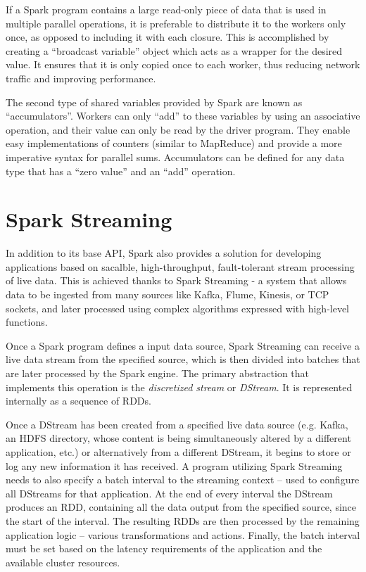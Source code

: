 \documentclass{l4proj}
\begin{document}
If a Spark program contains a large read-only piece of data that is used in multiple parallel operations, it is preferable to distribute it to the workers only once, as opposed to including it with each closure. This is accomplished by creating a ``broadcast variable'' object which acts as a wrapper for the desired value. It ensures that it is only copied once to each worker, thus reducing network traffic and improving performance.

The second type of shared variables provided by Spark are known as ``accumulators''. Workers can only ``add'' to these variables by using an associative operation, and their value can only be read by the driver program. They enable easy implementations of counters (similar to MapReduce) and provide a more imperative syntax for parallel sums. Accumulators can be defined for any data type that has a ``zero value'' and an ``add'' operation.

\section{Spark Streaming}

In addition to its base API, Spark also provides a solution for developing applications based on sacalble, high-throughput, fault-tolerant stream processing of live data. This is achieved thanks to Spark Streaming - a system that allows data to be ingested from many sources like Kafka, Flume, Kinesis, or TCP sockets, and later processed using complex algorithms expressed with high-level functions.

Once a Spark program defines a input data source, Spark Streaming can receive a live data stream from the specified source, which is then divided into batches that are later processed by the Spark engine. The primary abstraction that implements this operation is the \textit{discretized stream} or \textit{DStream}\cite{DStream}. It is represented internally as a sequence of RDDs.

Once a DStream has been created from a specified live data source (e.g. Kafka, an HDFS directory, whose content is being simultaneously altered by a different application, etc.) or alternatively from a different DStream, it begins to store or log any new information it has received. A program utilizing Spark Streaming needs to also specify a batch interval to the streaming context -- used to configure all DStreams for that application. At the end of every interval the DStream produces an RDD, containing all the data output from the specified source, since the start of the interval. The resulting RDDs are then processed by the remaining application logic -- various transformations and actions. Finally, the batch interval must be set based on the latency requirements of  the application and the available cluster resources.
\end{document}
